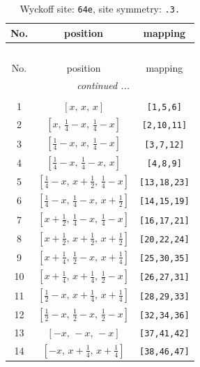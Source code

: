 \documentclass[fleqn,8pt]{jsarticle}
\begin{document}
\begin{longtable}{ccc}
\caption{Wyckoff site: {\tt 64e}, site symmetry: {\tt .3.}}
 \\
 \hline \hline
No. & position & mapping \\ \hline \endfirsthead

\multicolumn{2}{l}{\tablename\ \thetable{}} \\
 \hline \hline
No. & position & mapping \\ \hline \endhead

 \hline \hline
\multicolumn{2}{r}{\footnotesize\it continued ...} \\ \endfoot

 \hline \hline
\multicolumn{2}{r}{} \\ \endlastfoot

1 & $\left[ x,\, x,\, x \right]$ & {\tt [1,5,6]} \\ \hline
2 & $\left[ x,\, \frac{1}{4} - x,\, \frac{1}{4} - x \right]$ & {\tt [2,10,11]} \\ \hline
3 & $\left[ \frac{1}{4} - x,\, x,\, \frac{1}{4} - x \right]$ & {\tt [3,7,12]} \\ \hline
4 & $\left[ \frac{1}{4} - x,\, \frac{1}{4} - x,\, x \right]$ & {\tt [4,8,9]} \\ \hline
5 & $\left[ \frac{1}{4} - x,\, x + \frac{1}{2},\, \frac{1}{4} - x \right]$ & {\tt [13,18,23]} \\ \hline
6 & $\left[ \frac{1}{4} - x,\, \frac{1}{4} - x,\, x + \frac{1}{2} \right]$ & {\tt [14,15,19]} \\ \hline
7 & $\left[ x + \frac{1}{2},\, \frac{1}{4} - x,\, \frac{1}{4} - x \right]$ & {\tt [16,17,21]} \\ \hline
8 & $\left[ x + \frac{1}{2},\, x + \frac{1}{2},\, x + \frac{1}{2} \right]$ & {\tt [20,22,24]} \\ \hline
9 & $\left[ x + \frac{1}{4},\, \frac{1}{2} - x,\, x + \frac{1}{4} \right]$ & {\tt [25,30,35]} \\ \hline
10 & $\left[ x + \frac{1}{4},\, x + \frac{1}{4},\, \frac{1}{2} - x \right]$ & {\tt [26,27,31]} \\ \hline
11 & $\left[ \frac{1}{2} - x,\, x + \frac{1}{4},\, x + \frac{1}{4} \right]$ & {\tt [28,29,33]} \\ \hline
12 & $\left[ \frac{1}{2} - x,\, \frac{1}{2} - x,\, \frac{1}{2} - x \right]$ & {\tt [32,34,36]} \\ \hline
13 & $\left[ - x,\, - x,\, - x \right]$ & {\tt [37,41,42]} \\ \hline
14 & $\left[ - x,\, x + \frac{1}{4},\, x + \frac{1}{4} \right]$ & {\tt [38,46,47]} \\ \hline

\end{longtable}
\end{document}
